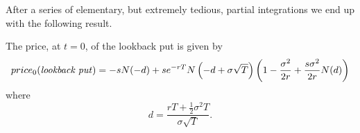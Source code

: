 After a series of elementary, but extremely tedious, partial integrations we end up with the following result.
\begin{proposition}
    The price, at $t=0$, of the lookback put is given by
    \begin{equation}
        price_0(\mbox{\emph{lookback put}}) = -sN(-d) + se^{-rT}N\left(-d+\sigma\sqrt{T}\right)\left(1-\frac{\sigma^2}{2r}+ \frac{s\sigma^2}{2r}N(d)\right)
    \end{equation}
    where
    \begin{equation}
        d = \frac{rT + \tfrac{1}{2}\sigma^2 T}{\sigma\sqrt{T}}.
    \end{equation}
\end{proposition}
